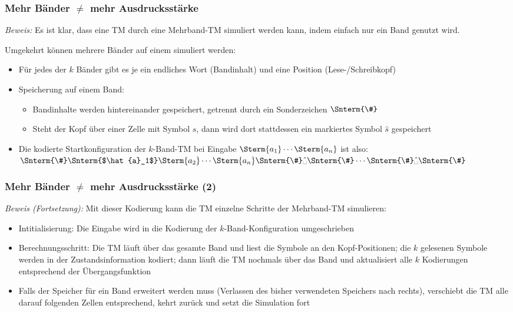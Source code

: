\documentclass[aspectratio=1610,onlymath]{beamer}
\begin{document}
\begin{frame}[t]\frametitle{Mehr Bänder $\neq$ mehr Ausdrucksstärke}

\pause

\emph{Beweis:} Es ist klar, dass eine TM durch eine Mehrband-TM simuliert werden kann, indem einfach
nur ein Band genutzt wird.\pause\medskip

Umgekehrt können mehrere Bänder auf einem simuliert werden:
\begin{itemize}
\item Für jedes der $k$ Bänder gibt es je ein endliches Wort (Bandinhalt) und eine Position (Lese-/Schreibkopf)
\item Speicherung auf einem Band:
\begin{itemize}
\item Bandinhalte werden hintereinander gespeichert, getrennt durch ein Sonderzeichen $\Snterm{\#}$
\item Steht der Kopf über einer Zelle mit Symbol $s$, dann wird dort stattdessen ein markiertes Symbol $\hat{s}$ gespeichert
\end{itemize}
\item Die kodierte Startkonfiguration der $k$-Band-TM bei Eingabe $\Sterm{a_1}\cdots\Sterm{a_n}$ ist also: $\Snterm{\#}\Snterm{$\hat{a}_1$}\Sterm{a_2}\cdots\Sterm{a_n}\Snterm{\#}\hat{\blank}\Snterm{\#}\cdots\Snterm{\#}\hat{\blank}\Snterm{\#}$
\end{itemize}

\end{frame}

\begin{frame}[t]\frametitle{Mehr Bänder $\neq$ mehr Ausdrucksstärke (2)}


\emph{Beweis (Fortsetzung):} Mit dieser Kodierung kann die TM einzelne Schritte der Mehrband-TM simulieren\pause:

\begin{itemize}
\item Intitialisierung: Die Eingabe wird in die Kodierung der $k$-Band-Konfiguration umgeschrieben\pause
\item Berechnungsschritt: Die TM läuft über das gesamte Band und liest die Symbole an den Kopf-Positionen;
die $k$ gelesenen Symbole werden in der Zustandsinformation kodiert; dann läuft die TM nochmals über das Band und aktualisiert alle $k$ Kodierungen entsprechend der Übergangsfunktion\pause
\item Falls der Speicher für ein Band erweitert werden muss (Verlassen des bisher verwendeten Speichers nach rechts),
verschiebt die TM alle darauf folgenden Zellen entsprechend, kehrt zurück und setzt die Simulation fort
\end{itemize}

\end{frame}
\end{document}
